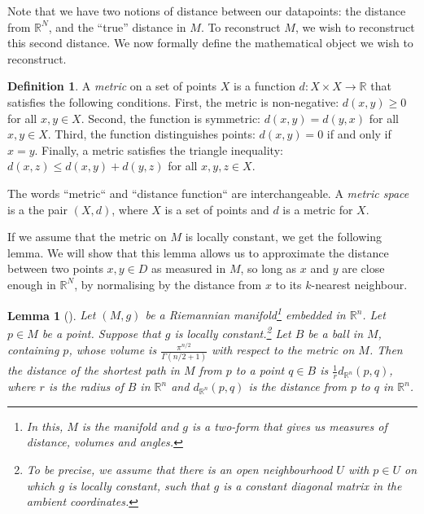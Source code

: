 \documentclass[a4paper,11pt,leqno]{article} \usepackage{amsmath}
\newcommand{\RR}{\mathbb{R}} \newcommand{\QQ}{\mathbb{Q}}
\newtheorem*{lemma}{Lemma}
\theoremstyle{definition}
\newtheorem{defn}{Definition}
\begin{document}
Note that we have two notions of distance between our datapoints: the distance
from $\RR^N$, and the ``true'' distance in $M$.
To reconstruct $M$, we wish to reconstruct this second distance.
We now formally define the mathematical object we wish to reconstruct.

\begin{defn}
  A \emph{metric} on a set of points $X$ is a function $d: X\times X\to \RR$
  that satisfies the following conditions.
  First, the metric is non-negative: $d(x, y) \geq 0$ for all $x, y\in X$.
  Second, the function is symmetric: $d(x, y) = d(y, x)$ for all $x, y\in X$.
  Third, the function distinguishes points: $d(x, y) = 0$ if and only if $x
  = y$.
  Finally, a metric satisfies the triangle inequality: $d(x, z)\leq d(x, y)
  + d(y, z)$ for all $x,y,z\in X$.
\end{defn}

The words ``metric`` and ``distance function`` are interchangeable.
A \emph{metric space} is a the pair $(X, d)$, where $X$ is a set of points and
$d$ is a metric for $X$.

If we assume that the metric on $M$ is locally constant, we get the following
lemma.
We will show that this lemma allows us to approximate the distance between two
points $x, y\in D$ as measured in $M$, so long as $x$ and $y$ are close enough
in $\RR^N$, by normalising by the distance from $x$ to its $k$-nearest
neighbour.

\begin{lemma}[\cite{McInnes18}]
  Let $(M, g)$ be a Riemannian manifold\footnote{
    In this, $M$ is the manifold and $g$ is a two-form that gives us measures of
    distance, volumes and angles.
  } embedded in $\RR^n$.
  Let $p\in M$ be a point.
  Suppose that $g$ is locally constant.\footnote{
    To be precise, we assume that there is an open neighbourhood $U$ with
    $p\in U$ on which $g$ is locally constant, such that $g$ is a constant
    diagonal matrix in the ambient coordinates.
  }
  Let $B$ be a ball in $M$, containing $p$, whose volume is
  $\frac{\pi^{n/2}}{\Gamma(n/2+1)}$ with respect to the metric on $M$.
  Then the distance of the shortest path in $M$ from $p$ to a point $q\in B$ is
  $\frac{1}{r}d_{\RR^n}(p, q)$, where $r$ is the radius of $B$ in $\RR^n$ and
  $d_{\RR^n}(p, q)$ is the distance from $p$ to $q$ in $\RR^n$.
\end{lemma}
\end{document}
